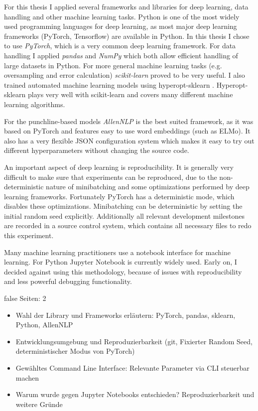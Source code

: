 \documentclass[draft,final,oneside]{vutinfth} %
\begin{document}
For this thesis I applied several frameworks and libraries for deep learning, data handling and other machine learning tasks. Python is one of the most widely used programming languages for deep learning, as most major deep learning frameworks (PyTorch, Tensorflow) are available in Python. In this thesis I chose to use \textit{PyTorch}, which is a very common deep learning framework. For data handling I applied \textit{pandas} and \textit{NumPy} which both allow efficient handling of large datasets in Python. For more general machine learning tasks (e.g. oversampling and error calculation) \textit{scikit-learn} proved to be very useful. I also trained automated machine learning models using hyperopt-sklearn \cite{hyperoptpaper}. Hyperopt-sklearn plays very well with scikit-learn and covers many different machine learning algorithms.


For the punchline-based models \textit{AllenNLP} is the best suited framework, as it was based on PyTorch and features easy to use word embeddings (such as ELMo). It also has a very flexible JSON configuration system which makes it easy to try out different hyperparameters without changing the source code.

An important aspect of deep learning is reproducibility. It is generally very difficult to make sure that experiments can be reproduced, due to the non-deterministic nature of minibatching and some optimizations performed by deep learning frameworks. Fortunately PyTorch has a deterministic mode, which disables these optimizations. Minibatching can be deterministic by setting the initial random seed explicitly. Additionally all relevant development milestones are recorded in a source control system, which contains all necessary files to redo this experiment.

Many machine learning practitioners use a notebook interface for machine learning. For Python Jupyter Notebook is currently widely used. Early on, I decided against using this methodology, because of issues with reproducibility and less powerful debugging functionality.

\if false
Seiten: 2

\begin{itemize}

\item Wahl der Library und Frameworks erläutern: PyTorch, pandas, sklearn, Python, AllenNLP
\item Entwicklungsumgebung und Reproduzierbarkeit (git, Fixierter Random Seed, deterministischer Modus von PyTorch)
\item Gewähltes Command Line Interface: Relevante Parameter via CLI steuerbar machen
\item Warum wurde gegen Jupyter Notebooks entschieden? Reproduzierbarkeit und weitere Gründe

\end{itemize}
\end{document}
